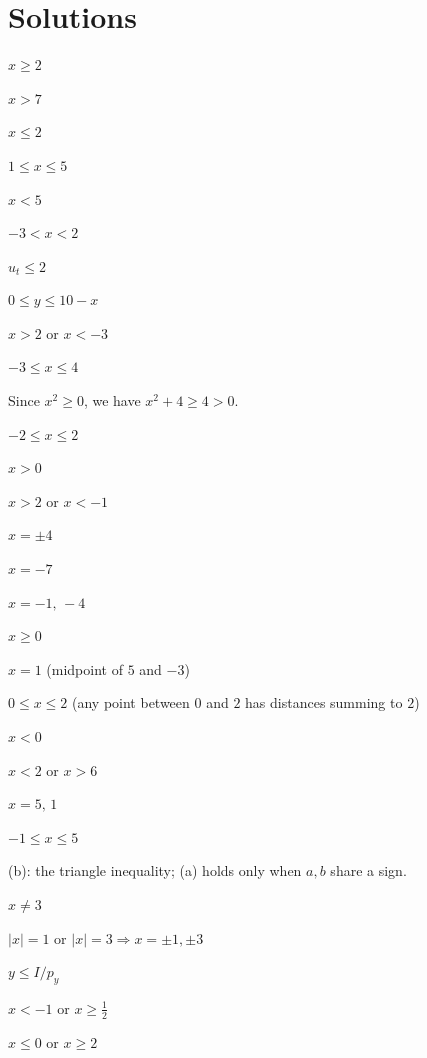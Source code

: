 \section{Solutions}

\begin{solutions}
  \item $x\ge 2$
  \item $x>7$
  \item $x\le 2$
  \item $1\le x\le 5$
  \item $x<5$
  \item $-3<x<2$
  \item $u_{t}\le 2$
  \item $0\le y\le 10-x$
  \item $x>2$ or $x<-3$
  \item $-3\le x\le 4$
  \item Since $x^{2}\ge 0$, we have $x^{2}+4\ge 4>0$.
  \item $-2\le x\le 2$
  \item $x>0$
  \item $x>2$ or $x<-1$
  \item $x=\pm 4$
  \item $x=-7$
  \item $x=-1,\,-4$
  \item $x\ge 0$
  \item $x=1$ (midpoint of $5$ and $-3$)
  \item $0\le x\le 2$ (any point between $0$ and $2$ has distances summing
        to $2$)
  \item $x<0$
  \item $x<2$ or $x>6$
  \item $x=5,\,1$
  \item $-1\le x\le 5$
  \item (b): the triangle inequality; (a) holds only when $a,b$ share a
        sign.
  \item $x\neq 3$
  \item $|x|=1$ or $|x|=3\Rightarrow x=\pm1,\pm3$
  \item $y\le I/p_{y}$
  \item $x<-1$ or $x\ge\tfrac12$
  \item $x\le 0$ or $x\ge 2$
\end{solutions}
